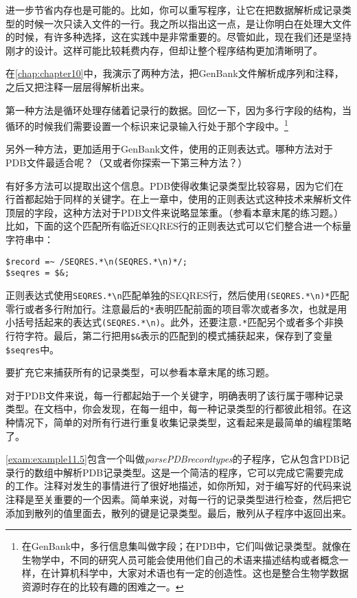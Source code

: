 进一步节省内存也是可能的。比如，你可以重写程序，让它在把数据解析成记录类型的时候一次只读入文件的一行。我之所以指出这一点，是让你明白在处理大文件的时候，有许多种选择，这在实践中是非常重要的。尽管如此，现在我们还是坚持刚才的设计。这样可能比较耗费内存，但却让整个程序结构更加清晰明了。

在\autoref{chap:chapter10}中，我演示了两种方法，把GenBank文件解析成序列和注释，之后又把注释一层层得解析出来。

第一种方法是循环处理存储着记录行的数据。回忆一下，因为多行字段的结构，当循环的时候我们需要设置一个标识来记录输入行处于那个字段中。\footnote{在GenBank中，多行信息集叫做字段；在PDB中，它们叫做记录类型。就像在生物学中，不同的研究人员可能会使用他们自己的术语来描述结构或者概念一样，在计算机科学中，大家对术语也有一定的创造性。这也是整合生物学数据资源时存在的比较有趣的困难之一。}

另外一种方法，更加适用于GenBank文件，使用的正则表达式。哪种方法对于PDB文件最适合呢？（又或者你探索一下第三种方法？）

有好多方法可以提取出这个信息。PDB使得收集记录类型比较容易，因为它们在行首都起始于同样的关键字。在上一章中，使用的正则表达式这种技术来解析文件顶层的字段，这种方法对于PDB文件来说略显笨重。（参看本章末尾的练习题。）比如，下面的这个匹配所有临近SEQRES行的正则表达式可以它们整合进一个标量字符串中：

\begin{lstlisting}
$record =~ /SEQRES.*\n(SEQRES.*\n)*/;
$seqres = $&;
\end{lstlisting}

正则表达式使用\verb|SEQRES.*\n|匹配单独的SEQRES行，然后使用\verb|(SEQRES.*\n)*|匹配零行或者多行附加行。注意最后的\verb|*|表明匹配前面的项目零次或者多次，也就是用小括号括起来的表达式\verb|(SEQRES.*\n)|。此外，还要注意\verb|.*|匹配另个或者多个非换行符字符。最后，第二行把用\verb|$&|表示的匹配到的模式捕获起来，保存到了变量\verb|$seqres|中。

要扩充它来捕获所有的记录类型，可以参看本章末尾的练习题。

对于PDB文件来说，每一行都起始于一个关键字，明确表明了该行属于哪种记录类型。在文档中，你会发现，在每一组中，每一种记录类型的行都彼此相邻。在这种情况下，简单的对所有行进行重复收集记录类型，这看起来是最简单的编程策略了。

\autoref{exam:example11.5}包含一个叫做\textit{parsePDBrecordtypes}的子程序，它从包含PDB记录行的数组中解析PDB记录类型。这是一个简洁的程序，它可以完成它需要完成的工作。注释对发生的事情进行了很好地描述，如你所知，对于编写好的代码来说注释是至关重要的一个因素。简单来说，对每一行的记录类型进行检查，然后把它添加到散列的值里面去，散列的键是记录类型。最后，散列从子程序中返回出来。

